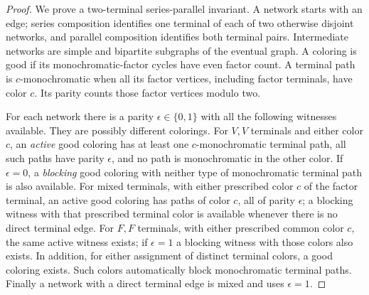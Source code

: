 \begin{proof}
We prove a two-terminal series-parallel invariant. A network starts with
an edge; series composition identifies one terminal of each of two
otherwise disjoint networks, and parallel composition identifies both
terminal pairs. Intermediate networks are simple and bipartite subgraphs
of the eventual graph. A coloring is good if its monochromatic-factor
cycles have even factor count. A terminal path is $c$-monochromatic when
all its factor vertices, including factor terminals, have color $c$.
Its parity counts those factor vertices modulo two.

For each network there is a parity $\epsilon\in\{0,1\}$ with all the
following witnesses available. They are possibly different colorings.
For $V,V$ terminals and either color $c$, an \emph{active} good coloring
has at least one $c$-monochromatic terminal path, all such paths have
parity $\epsilon$, and no path is monochromatic in the other color.
If $\epsilon=0$, a \emph{blocking} good coloring with neither type of
monochromatic terminal path is also available. For mixed terminals,
with either prescribed color $c$ of the factor terminal, an active good
coloring has paths of color $c$, all of parity $\epsilon$; a blocking
witness with that prescribed terminal color is available whenever there
is no direct terminal edge. For $F,F$ terminals, with either prescribed
common color $c$, the same active witness exists; if $\epsilon=1$ a
blocking witness with those colors also exists. In addition, for either
assignment of distinct terminal colors, a good coloring exists. Such
colors automatically block monochromatic terminal paths. Finally a
network with a direct terminal edge is mixed and uses $\epsilon=1$.


\end{proof}
